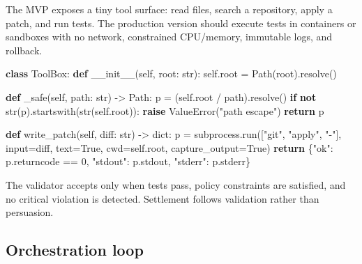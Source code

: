 \documentclass[11pt]{article}
\newenvironment{Shaded}{}{}
\newcommand{\BuiltInTok}[1]{\textcolor[rgb]{0.00,0.50,0.00}{#1}}
\newcommand{\ControlFlowTok}[1]{\textcolor[rgb]{0.00,0.44,0.13}{\textbf{#1}}}
\newcommand{\DecValTok}[1]{\textcolor[rgb]{0.25,0.63,0.44}{#1}}
\newcommand{\FunctionTok}[1]{\textcolor[rgb]{0.02,0.16,0.49}{#1}}
\newcommand{\KeywordTok}[1]{\textcolor[rgb]{0.00,0.44,0.13}{\textbf{#1}}}
\newcommand{\NormalTok}[1]{#1}
\newcommand{\OperatorTok}[1]{\textcolor[rgb]{0.40,0.40,0.40}{#1}}
\newcommand{\PreprocessorTok}[1]{\textcolor[rgb]{0.74,0.48,0.00}{#1}}
\newcommand{\StringTok}[1]{\textcolor[rgb]{0.25,0.44,0.63}{#1}}
\newcommand{\VariableTok}[1]{\textcolor[rgb]{0.10,0.09,0.49}{#1}}
\begin{document}
The MVP exposes a tiny tool surface: read files, search a repository, apply a patch, and run tests. The production version should execute tests in containers or sandboxes with no network, constrained CPU/memory, immutable logs, and rollback.

\begin{Shaded}
\begin{Highlighting}[]
\KeywordTok{class}\NormalTok{ ToolBox:}
    \KeywordTok{def} \FunctionTok{\_\_init\_\_}\NormalTok{(}\VariableTok{self}\NormalTok{, root: }\BuiltInTok{str}\NormalTok{):}
        \VariableTok{self}\NormalTok{.root }\OperatorTok{=}\NormalTok{ Path(root).resolve()}

    \KeywordTok{def}\NormalTok{ \_safe(}\VariableTok{self}\NormalTok{, path: }\BuiltInTok{str}\NormalTok{) }\OperatorTok{{-}\textgreater{}}\NormalTok{ Path:}
\NormalTok{        p }\OperatorTok{=}\NormalTok{ (}\VariableTok{self}\NormalTok{.root }\OperatorTok{/}\NormalTok{ path).resolve()}
        \ControlFlowTok{if} \KeywordTok{not} \BuiltInTok{str}\NormalTok{(p).startswith(}\BuiltInTok{str}\NormalTok{(}\VariableTok{self}\NormalTok{.root)):}
            \ControlFlowTok{raise} \PreprocessorTok{ValueError}\NormalTok{(}\StringTok{"path escape"}\NormalTok{)}
        \ControlFlowTok{return}\NormalTok{ p}

    \KeywordTok{def}\NormalTok{ write\_patch(}\VariableTok{self}\NormalTok{, diff: }\BuiltInTok{str}\NormalTok{) }\OperatorTok{{-}\textgreater{}} \BuiltInTok{dict}\NormalTok{:}
\NormalTok{        p }\OperatorTok{=}\NormalTok{ subprocess.run([}\StringTok{"git"}\NormalTok{, }\StringTok{"apply"}\NormalTok{, }\StringTok{"{-}"}\NormalTok{], }\BuiltInTok{input}\OperatorTok{=}\NormalTok{diff, text}\OperatorTok{=}\VariableTok{True}\NormalTok{,}
\NormalTok{                           cwd}\OperatorTok{=}\VariableTok{self}\NormalTok{.root, capture\_output}\OperatorTok{=}\VariableTok{True}\NormalTok{)}
        \ControlFlowTok{return}\NormalTok{ \{}\StringTok{"ok"}\NormalTok{: p.returncode }\OperatorTok{==} \DecValTok{0}\NormalTok{, }\StringTok{"stdout"}\NormalTok{: p.stdout, }\StringTok{"stderr"}\NormalTok{: p.stderr\}}
\end{Highlighting}
\end{Shaded}

The validator accepts only when tests pass, policy constraints are satisfied, and no critical violation is detected. Settlement follows validation rather than persuasion.

\subsection{Orchestration loop}\label{orchestration-loop}
\end{document}
